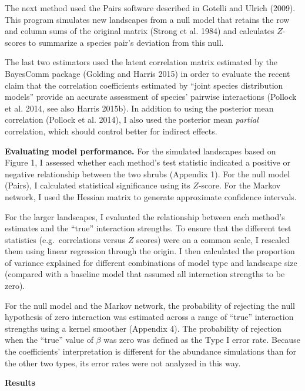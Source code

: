\documentclass[12pt,]{article}
\begin{document}
\begin{spacing}{1.9}
\begin{flushleft}
The next method used the Pairs software described in Gotelli and Ulrich
(2009). This program simulates new landscapes from a null model that
retains the row and column sums of the original matrix (Strong et al.
1984) and calculates \(Z\)-scores to summarize a species pair's
deviation from this null.

The last two estimators used the latent correlation matrix estimated by
the BayesComm package (Golding and Harris 2015) in order to evaluate the
recent claim that the correlation coefficients estimated by ``joint
species distribution models'' provide an accurate assessment of species'
pairwise interactions (Pollock et al. 2014, see also Harris 2015b). In
addition to using the posterior mean correlation (Pollock et al. 2014),
I also used the posterior mean \emph{partial} correlation, which should
control better for indirect effects.

\noindent \textbf{Evaluating model performance.} For the simulated
landscapes based on Figure 1, I assessed whether each method's test
statistic indicated a positive or negative relationship between the two
shrubs (Appendix 1). For the null model (Pairs), I calculated
statistical significance using its \(Z\)-score. For the Markov network,
I used the Hessian matrix to generate approximate confidence intervals.

For the larger landscapes, I evaluated the relationship between each
method's estimates and the ``true'' interaction strengths. To ensure
that the different test statistics (e.g.~correlations versus \(Z\)
scores) were on a common scale, I rescaled them using linear regression
through the origin. I then calculated the proportion of variance
explained for different combinations of model type and landscape size
(compared with a baseline model that assumed all interaction strengths
to be zero).

For the null model and the Markov network, the probability of rejecting
the null hypothesis of zero interaction was estimated across a range of
``true'' interaction strengths using a kernel smoother (Appendix 4). The
probability of rejection when the ``true'' value of \(\beta\) was zero
was defined as the Type I error rate. Because the coefficients'
interpretation is different for the abundance simulations than for the
other two types, its error rates were not analyzed in this way.

\noindent
\textbf{Results}


\end{flushleft}
\end{spacing}
\end{document}
